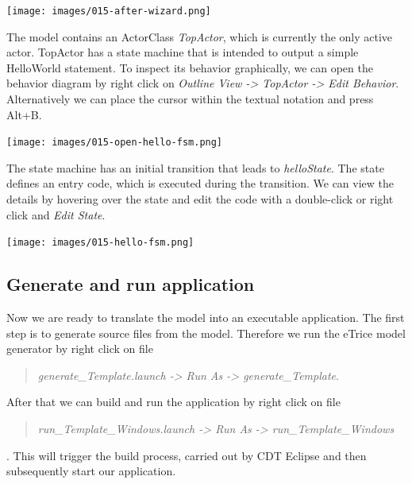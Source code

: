 \texttt{[image: images/015-after-wizard.png]}

The model contains an ActorClass \emph{TopActor}, which is currently the only active actor. TopActor has a state machine that is intended to output a simple HelloWorld statement. To inspect its behavior graphically, we can open the behavior diagram by right click on \emph{Outline View -> TopActor -> Edit Behavior}. Alternatively we can place the cursor within the textual notation and press Alt+B.

\texttt{[image: images/015-open-hello-fsm.png]}

The state machine has an initial transition that leads to \emph{helloState}. The state defines an entry code, which is executed during the transition. We can view the details by hovering over the state and edit the code with a double-click or right click and \emph{Edit State}.

\texttt{[image: images/015-hello-fsm.png]}

\subsection{Generate and run application}

Now we are ready to translate the model into an executable application. The first step is to generate source files from the model. Therefore we run the eTrice model generator by right click on file \begin{quote}
	\emph{generate\_Template.launch -> Run As -> generate\_Template}.
\end{quote}
After that we can build and run the application by right click on file
\begin{quote}
	\emph{run\_Template\_Windows.launch -> Run As -> run\_Template\_Windows}
\end{quote}.
This will trigger the build process, carried out by CDT Eclipse and then subsequently start our application.


